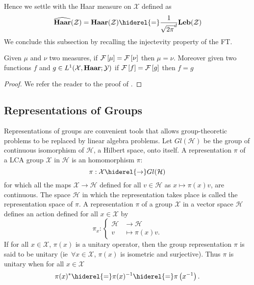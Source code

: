 Hence we settle with the Haar measure on $\mathcal{X}$ defined as
\begin{dmath*}
    \dual{\Haar}(\mathcal{Z})
    = \Haar(\mathcal{Z})
    \hiderel{=} \frac{1}{\sqrt{2\pi}^d} \Leb(\mathcal{Z})
\end{dmath*}
We conclude this subsection by recalling the injectevity property of the
\acl{FT}.
\begin{corollary}
    Given $\mu$ and $\nu$ two measures, if $\mathcal{F}\left[\mu\right]=\mathcal{F}\left[\nu\right]$ then $\mu=\nu$.
    Moreover given two functions $f$ and $g\in
    L^1(\mathcal{X},\mathbf{Haar};\mathcal{Y})$ if $\mathcal{F}\left[f\right]=\mathcal{F}\left[g\right]$ then $f=g$
\end{corollary}
\begin{proof}
    We refer the reader to the proof of \citet[corollary~4.34
    page~112]{folland1994course}.
\end{proof}

\subsection{Representations of Groups}
Representations of groups are convenient tools that allows
group\--\-theo\-re\-tic problems to be replaced by linear algebra problems. Let
$Gl(\mathcal{H})$ be the group of continuous isomorphism of $\mathcal{H}$, a
Hilbert space, onto itself. A representation $\pi$ of a \ac{LCA} group
$\mathcal{X}$ in $\mathcal{H}$ is an homomorphism $\pi$:
\begin{dmath*}
    \pi:\mathcal{X}\hiderel{\to} Gl(\mathcal{H})
\end{dmath*}
for which all the maps $\mathcal{X}\to\mathcal{H}$ defined for all
$v\in\mathcal{H}$ as $x\mapsto \pi(x)v$, are continuous. The space
$\mathcal{H}$ in which the representation takes place is called the
representation space of $\pi$. A representation $\pi$ of a group $\mathcal{X}$
in a vector space $\mathcal{H}$ defines an action defined for all
$x\in\mathcal{X}$ by
\begin{dmath*}
    \pi_x:
    \begin{cases}
        \mathcal{H}&\to\mathcal{H} \\
        v &\mapsto \pi(x)v.
    \end{cases}
\end{dmath*}
If for all $x\in\mathcal{X}$, $\pi(x)$ is a unitary operator, then the group
representation $\pi$ is said to be unitary (\acs{ie}~$\forall x\in\mathcal{X}$,
$\pi(x)$ is isometric and surjective). Thus $\pi$ is unitary when for all
$x\in\mathcal{X}$
\begin{dmath*}
    \pi(x)^*\hiderel{=}\pi(x)^{-1}\hiderel{=}\pi\left(x^{-1}\right).
\end{dmath*}
